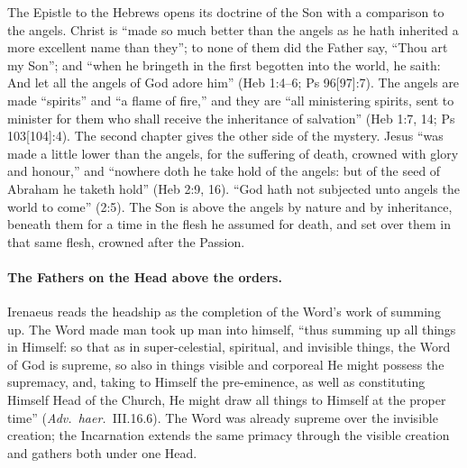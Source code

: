The Epistle to the Hebrews opens its doctrine of the Son with a comparison
to the angels. Christ is ``made so much better than the angels as he hath
inherited a more excellent name than they''; to none of them did the Father
say, ``Thou art my Son''; and ``when he bringeth in the first begotten into
the world, he saith: And let all the angels of God adore him'' (Heb 1:4--6;
Ps 96[97]:7). The angels are made ``spirits'' and ``a flame of fire,'' and
they are ``all ministering spirits, sent to minister for them who shall
receive the inheritance of salvation'' (Heb 1:7, 14; Ps 103[104]:4). The
second chapter gives the other side of the mystery. Jesus ``was made a
little lower than the angels, for the suffering of death, crowned with glory
and honour,'' and ``nowhere doth he take hold of the angels: but of the seed
of Abraham he taketh hold'' (Heb 2:9, 16). ``God hath not subjected unto
angels the world to come'' (2:5). The Son is above the angels by nature and
by inheritance, beneath them for a time in the flesh he assumed for death,
and set over them in that same flesh, crowned after the Passion.

\paragraph{The Fathers on the Head above the orders.} Irenaeus reads the
headship as the completion of the Word's work of summing up. The Word made
man took up man into himself, ``thus summing up all things in Himself: so
that as in super-celestial, spiritual, and invisible things, the Word of God
is supreme, so also in things visible and corporeal He might possess the
supremacy, and, taking to Himself the pre-eminence, as well as constituting
Himself Head of the Church, He might draw all things to Himself at the
proper time'' (\emph{Adv.\ haer.}\ III.16.6). The Word was already supreme
over the invisible creation; the Incarnation extends the same primacy
through the visible creation and gathers both under one Head.

